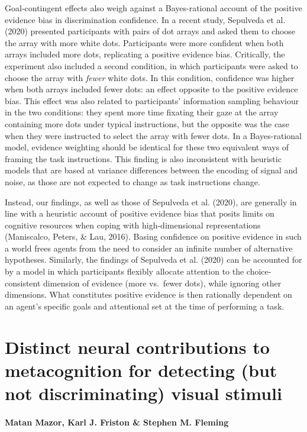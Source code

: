 \documentclass[12pt,twoside]{reedthesis}
\begin{document}
Goal-contingent effects also weigh against a Bayes-rational account of the positive evidence bias in discrimination confidence. In a recent study, Sepulveda et al. (2020) presented participants with pairs of dot arrays and asked them to choose the array with more white dots. Participants were more confident when both arrays included more dots, replicating a positive evidence bias. Critically, the experiment also included a second condition, in which participants were asked to choose the array with \emph{fewer} white dots. In this condition, confidence was higher when both arrays included fewer dots: an effect opposite to the positive evidence bias. This effect was also related to participants' information sampling behaviour in the two conditions: they spent more time fixating their gaze at the array containing more dots under typical instructions, but the opposite was the case when they were instructed to select the array with fewer dots. In a Bayes-rational model, evidence weighting should be identical for these two equivalent ways of framing the task instructions. This finding is also inconsistent with heuristic models that are based at variance differences between the encoding of signal and noise, as those are not expected to change as task instructions change.

Instead, our findings, as well as those of Sepulveda et al. (2020), are generally in line with a heuristic account of positive evidence bias that posits limits on cognitive resources when coping with high-dimensional representations (Maniscalco, Peters, \& Lau, 2016). Basing confidence on positive evidence in such a world frees agents from the need to consider an infinite number of alternative hypotheses. Similarly, the findings of Sepulveda et al. (2020) can be accounted for by a model in which participants flexibly allocate attention to the choice-consistent dimension of evidence (more vs.~fewer dots), while ignoring other dimensions. What constitutes positive evidence is then rationally dependent on an agent's specific goals and attentional set at the time of performing a task.

\hypertarget{ch-fMRI}{%
\chapter{Distinct neural contributions to metacognition for detecting (but not discriminating) visual stimuli}\label{ch-fMRI}}

\hypertarget{matan-mazor-karl-j.-friston-stephen-m.-fleming}{%
\subsubsection*{Matan Mazor, Karl J. Friston \& Stephen M. Fleming}\label{matan-mazor-karl-j.-friston-stephen-m.-fleming}}
\end{document}
